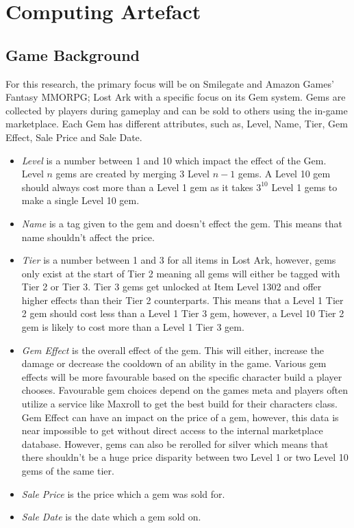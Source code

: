 \documentclass[journal]{IEEEtran}
\begin{document}
\section{Computing Artefact}
\subsection{Game Background}
\noindent For this research, the primary focus will be on Smilegate and Amazon Games' Fantasy MMORPG; Lost Ark\cite{LostArk2019} with a specific focus on its Gem system. Gems are collected by players during gameplay and can be sold to others using the in-game marketplace. Each Gem has different attributes, such as, Level, Name, Tier, Gem Effect, Sale Price and Sale Date.
\begin{itemize}
    \item \textit{Level} is a number between 1 and 10 which impact the effect of the Gem. Level \( n \) gems are created by merging 3 Level  \( n-1 \) gems. A Level 10 gem should always cost more than a Level 1 gem as it takes \( 3^{10} \) Level 1 gems to make a single Level 10 gem.
    \item \textit{Name} is a tag given to the gem and doesn't effect the gem. This means that name shouldn't affect the price.
    \item \textit{Tier} is a number between 1 and 3 for all items in Lost Ark, however, gems only exist at the start of Tier 2 meaning all gems will either be tagged with Tier 2 or Tier 3. Tier 3 gems get unlocked at Item Level 1302 and offer higher effects than their Tier 2 counterparts. This means that a Level 1 Tier 2 gem should cost less than a Level 1 Tier 3 gem, however, a Level 10 Tier 2 gem is likely to cost more than a Level 1 Tier 3 gem.
    \item \textit{Gem Effect} is the overall effect of the gem. This will either, increase the damage or decrease the cooldown of an ability in the game. Various gem effects will be more favourable based on the specific character build a player chooses. Favourable gem choices depend on the games meta and players often utilize a service like Maxroll\cite{Maxroll2022} to get the best build for their characters class. Gem Effect can have an impact on the price of a gem, however, this data is near impossible to get without direct access to the internal marketplace database. However, gems can also be rerolled for silver which means that there shouldn't be a huge price disparity between two Level 1 or two Level 10 gems of the same tier.
    \item \textit{Sale Price} is the price which a gem was sold for.
    \item \textit{Sale Date} is the date which a gem sold on.
\end{itemize}
\end{document}
